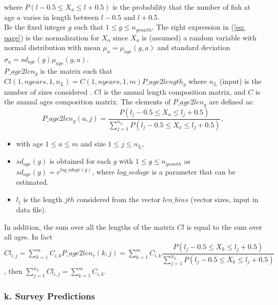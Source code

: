 \documentclass{article}
\begin{document}
where $P(l-0.5\leq X_a\leq l+0.5 )$ is the probability that the number of fish at age $a$ varies in length between $l-0.5$ and $l+0.5$.\\

Be the fixed integer $g$ such that $1\leq g \leq n_{growth}$.
The right expression in (\ref{eq: page}) is the normalization for $X_a$ since $X_a$ is (assumed) a random variable with normal distribution with mean $\mu_a =\mu_{age}(g,a)$ and standard deviation $\sigma_{a}= sd_{age}(g) \mu_{age}(g,a)$. \\

 $P\_age2len_g$ is the matrix such that $Cl(1,nyears,1,n_L) = C(1,nyears,1,m) P\_age2length_g$ where $n_L$ (input) is the number of sizes considered %
 . $Cl$ is the annual length composition matrix, and $C$ is the annual ages composition matrix. The elements of $P\_age2len_g$ are defined as:
\begin{equation}
    P\_age2len_g(a,j) = \dfrac{P(l_j-0.5\leq X_a\leq l_j+0.5 )}{\displaystyle\sum_{j=1}^{n_L}P(l_j-0.5\leq X_a\leq l_j+0.5 )}, 
\end{equation}

\begin{itemize}
    \item with age $1\leq a \leq m$ and size $1\leq j \leq n_L$,
    \item $sd_{age}(g)$ is obtained  for each $g$ with $1\leq g\leq n_{growth}$ as $sd_{age}(g)   = e^{log\_sdage(g)}$, where $log\_sedage$ is a parameter that can be estimated.
    \item $l_j$ is the length $jth$ considered from the vector $len\_bins$ (vector sizes, input in data file).
\end{itemize}
In addition, the sum over all the lengths of the matrix $Cl$ is equal to the sum over all ages. In fact $Cl_{i,j} = \displaystyle\sum_{k=1}^m C_{i,k} P\_age2len_r(k,j) = \displaystyle\sum_{k=1}^m C_{i,k} \dfrac{P(l_j-0.5\leq X_k\leq l_j+0.5 )}{\displaystyle\sum_{j=1}^{n_L}P(l_j-0.5\leq X_k\leq l_j+0.5 )}$, then 
$\displaystyle\sum_{j=1}^{n_L}Cl_{i,j} = \displaystyle\sum_{k=1}^m{C_{i,k}}$.


\subsubsection{k. Survey Predictions} \label{surveypred}
\end{document}
